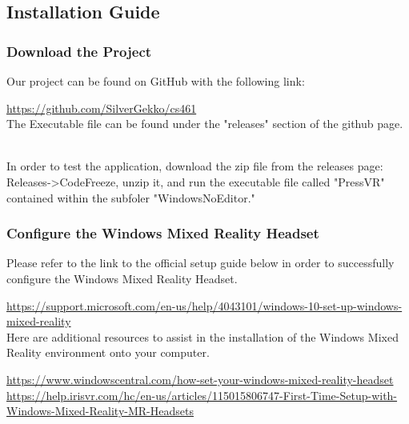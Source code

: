 \documentclass[onecolumn, draftclsnofoot,10pt, compsoc]{IEEEtran}
\begin{document}
\subsection{Installation Guide}
\subsubsection{Download the Project}

Our project can be found on GitHub with the following link:

\noindent
\href{https://github.com/SilverGekko/cs461}{https://github.com/SilverGekko/cs461}\\

\noindent
The Executable file can be found under the "releases" section of the github page.

\\

In order to test the application, download the zip file from the releases page: Releases->CodeFreeze, unzip it, and run the executable file called "PressVR" contained within the subfoler "WindowsNoEditor."

\subsubsection{Configure the Windows Mixed Reality Headset}

Please refer to the link to the official setup guide below in order to successfully configure the Windows Mixed Reality Headset.

\noindent
\href{https://support.microsoft.com/en-us/help/4043101/windows-10-set-up-windows-mixed-reality}{https://support.microsoft.com/en-us/help/4043101/windows-10-set-up-windows-mixed-reality}\\

Here are additional resources to assist in the installation of the Windows Mixed Reality environment onto your computer. 

\noindent
\href{https://www.windowscentral.com/how-set-your-windows-mixed-reality-headset}{https://www.windowscentral.com/how-set-your-windows-mixed-reality-headset}\\
\noindent
\href{https://help.irisvr.com/hc/en-us/articles/115015806747-First-Time-Setup-with-Windows-Mixed-Reality-MR-Headsets}{https://help.irisvr.com/hc/en-us/articles/115015806747-First-Time-Setup-with-Windows-Mixed-Reality-MR-Headsets}\\
\end{document}
